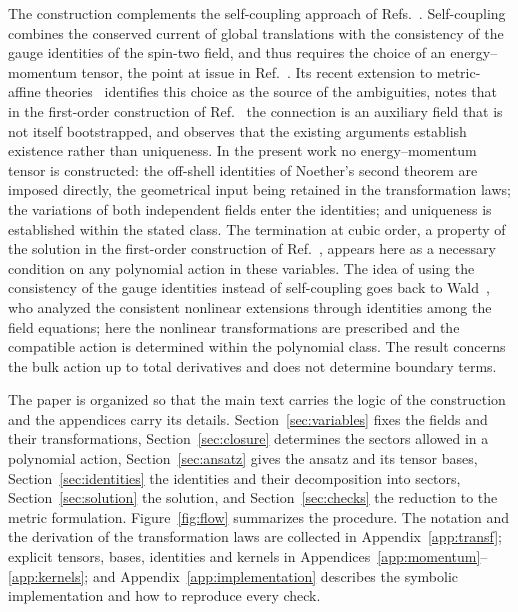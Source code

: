\documentclass[prd,aps,preprint,nofootinbib,amsmath,amssymb,eqsecnum]{revtex4-2}
\begin{document}
The construction complements the self-coupling approach of
Refs.~\cite{Deser1970,Deser2010}. Self-coupling combines the conserved current of global
translations with the consistency of the gauge identities of the spin-two field, and thus
requires the choice of an energy--momentum tensor, the point at issue in
Ref.~\cite{Padmanabhan2008}. Its recent extension to metric-affine theories~\cite{Delhom2023}
identifies this choice as the source of the ambiguities, notes that in the first-order
construction of Ref.~\cite{Deser1970} the connection is an auxiliary field that is not itself
bootstrapped, and observes that the existing arguments establish existence rather than
uniqueness. In the present work no energy--momentum tensor is constructed: the off-shell identities of
Noether's second theorem are imposed directly, the geometrical input being retained in the
transformation laws; the variations of both independent fields enter the identities; and
uniqueness is established within the stated class. The termination at cubic order, a
property of the solution in the first-order construction of Ref.~\cite{Deser1970}, appears here
as a necessary condition on any polynomial action in these variables. The idea of using the consistency of the
gauge identities instead of self-coupling goes back to Wald~\cite{Wald1986}, who analyzed the
consistent nonlinear extensions through identities among the field equations; here the
nonlinear transformations are prescribed and the compatible action is determined within the
polynomial class. The result concerns the bulk action up to total derivatives and does not
determine boundary terms.

The paper is organized so that the main text carries the logic of the construction and the
appendices carry its details. Section~\ref{sec:variables} fixes the fields and their
transformations, Section~\ref{sec:closure} determines the sectors allowed in a polynomial action,
Section~\ref{sec:ansatz} gives the ansatz and its tensor bases, Section~\ref{sec:identities}
the identities and their decomposition into sectors, Section~\ref{sec:solution} the solution,
and Section~\ref{sec:checks} the reduction to the metric formulation. Figure~\ref{fig:flow} summarizes the procedure. The notation and the derivation of the
transformation laws are collected in Appendix~\ref{app:transf}; explicit tensors, bases,
identities and kernels in Appendices~\ref{app:momentum}--\ref{app:kernels}; and
Appendix~\ref{app:implementation} describes the symbolic implementation and how to reproduce
every check.
\end{document}
